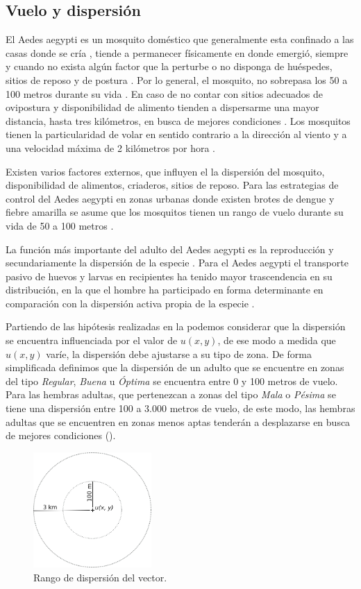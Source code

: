 
\subsection{Vuelo y dispersión}
\label{subsec:cap4-vuelo-dispersion}
El Aedes aegypti es un mosquito doméstico que generalmente esta confinado a las casas donde se
cría \cite{luevano1993ciclo}, tiende a permanecer físicamente en donde emergió, siempre y cuando
no exista algún factor que la perturbe o no disponga de huéspedes, sitios de reposo y de postura
\cite{ThironIzcazaJ2003}. Por lo general, el mosquito, no sobrepasa los 50 a 100 metros durante su
vida \cite{cabezas2005dengue}. En caso de no contar con sitios adecuados de ovipostura y
disponibilidad de alimento tienden a dispersarme una mayor distancia, hasta tres kilómetros, en
busca de mejores condiciones \cite{ThironIzcazaJ2003}. Los mosquitos tienen la particularidad de
volar en sentido contrario a la dirección al viento \cite{ThironIzcazaJ2003,web-site:speedAnimals}
y a una velocidad máxima de 2 kilómetros por hora \cite{web-site:speedAnimals,kaufmann2004flight}.

Existen varios factores externos, que influyen el la dispersión del mosquito, disponibilidad de
alimentos, criaderos, sitios de reposo. Para las estrategias de control del Aedes aegypti en zonas
urbanas donde existen brotes de dengue y fiebre amarilla se asume que los mosquitos tienen un
rango de vuelo durante su vida de 50 a 100 metros \cite{dengueUruguayCap8}.

La función más importante del adulto del Aedes aegypti es la reproducción y secundariamente la
dispersión de la especie \cite{ThironIzcazaJ2003}. Para el Aedes aegypti el transporte pasivo de
huevos y larvas en recipientes ha tenido mayor trascendencia en su distribución, en la que el
hombre ha participado en forma determinante en comparación con la dispersión activa propia de la
especie \citep{ThironIzcazaJ2003}.

Partiendo de las hipótesis realizadas en la  podemos considerar
que la dispersión se encuentra influenciada por el valor de $u(x,y)$, de ese modo a medida que
$u(x,y)$ varíe, la dispersión debe ajustarse a su tipo de zona. De forma simplificada definimos que
la dispersión de un adulto que se encuentre en zonas del tipo \textit{Regular}, \textit{Buena} u
\textit{Óptima} se encuentra entre 0 y 100 metros de vuelo. Para las hembras adultas, que
pertenezcan a zonas del tipo \textit{Mala} o \textit{Pésima} se tiene una dispersión entre 100 a
3.000 metros de vuelo, de este modo, las hembras adultas que se encuentren en zonas menos aptas
tenderán a desplazarse en busca de mejores condiciones ().

\begin{figure}[!hptb]
\centering
\includegraphics[width=0.4\textwidth]{capitulo-4/graphics/rango-vuelo.png}
\caption{\label{fig:cap4-dispersion} Rango de dispersión del vector.}
\end{figure}
